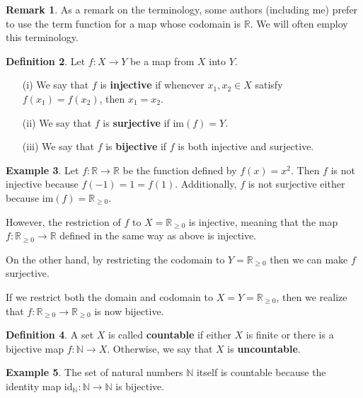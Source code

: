 \documentclass[12pt]{article}
\theoremstyle{definition}
\newtheorem{definition}{Definition}
\newtheorem{example}[definition]{Example}
\newtheorem{remark}[definition]{Remark}
\theoremstyle{theorem}
\begin{document}
\begin{remark}
As a remark on the terminology, some authors (including me) prefer to use the term function for a map whose codomain is $\mathbb{R}$. We will often employ this terminology. 
\end{remark}

\begin{definition}
Let $f : X \to Y$ be a map from $X$ into $Y$. 
\begin{enumerate}
\item[(i)] We say that $f$ is \textbf{injective} if whenever $x_1, x_2 \in X$ satisfy $f(x_1) = f(x_2)$, then $x_1 = x_2$. 
\item[(ii)] We say that $f$ is \textbf{surjective} if $\text{im}(f) = Y$. 
\item[(iii)] We say that $f$ is \textbf{bijective} if $f$ is both injective and surjective. 
\end{enumerate}
\end{definition}

\begin{example}
Let $f : \mathbb{R} \to \mathbb{R}$ be the function defined by $f(x) = x^2$. Then $f$ is not injective because $f(-1) = 1 = f(1)$. Additionally, $f$ is not surjective either because $\text{im}(f) = \mathbb{R}_{\geqslant 0}$. 

However, the restriction of $f$ to $X = \mathbb{R}_{\geqslant 0}$ is injective, meaning that the map $f : \mathbb{R}_{\geqslant 0} \to \mathbb{R}$ defined in the same way as above is injective. 

On the other hand, by restricting the codomain to $Y = \mathbb{R}_{\geqslant 0}$ then we can make $f$ surjective. 

If we restrict both the domain and codomain to $X = Y = \mathbb{R}_{\geqslant 0}$, then we realize that $f : \mathbb{R}_{\geqslant 0} \to \mathbb{R}_{\geqslant 0}$ is now bijective. 
\end{example}

\begin{definition}
A set $X$ is called \textbf{countable} if either $X$ is finite or there is a bijective map $f : \mathbb{N} \to X$. Otherwise, we say that $X$ is \textbf{uncountable}.
\end{definition}

\begin{example}
The set of natural numbers $\mathbb{N}$ itself is countable because the identity map $\text{id}_{\mathbb{N}} : \mathbb{N} \to \mathbb{N}$ is bijective. 
\end{example}
\end{document}
